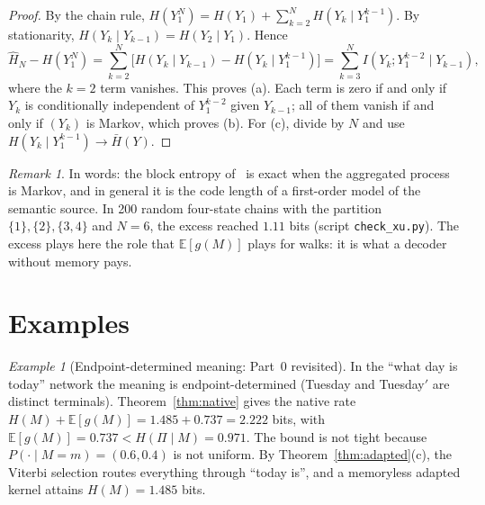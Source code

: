 \documentclass[11pt]{article}
\theoremstyle{definition}
\theoremstyle{remark}
\newtheorem{remark}{Remark}
\newtheorem{example}{Example}
\newcommand{\E}{\mathbb{E}}
\begin{document}
\begin{proof}
By the chain rule, $H(Y_1^N)=H(Y_1)+\sum_{k=2}^NH(Y_k\mid Y_1^{k-1})$. By stationarity, $H(Y_k\mid Y_{k-1})=H(Y_2\mid Y_1)$. Hence
\[
\widehat H_N-H(Y_1^N)=\sum_{k=2}^N\bigl[H(Y_k\mid Y_{k-1})-H(Y_k\mid Y_1^{k-1})\bigr]=\sum_{k=3}^NI(Y_k;Y_1^{k-2}\mid Y_{k-1}),
\]
where the $k=2$ term vanishes. This proves (a). Each term is zero if and only if $Y_k$ is conditionally independent of $Y_1^{k-2}$ given $Y_{k-1}$; all of them vanish if and only if $(Y_k)$ is Markov, which proves (b). For (c), divide by $N$ and use $H(Y_k\mid Y_1^{k-1})\to\bar H(Y)$.
\end{proof}

\begin{remark}
In words: the block entropy of~\cite[Thm.~3]{xu2025} is exact when the aggregated process is Markov, and in general it is the code length of a first-order model of the semantic source. In 200 random four-state chains with the partition $\{1\},\{2\},\{3,4\}$ and $N=6$, the excess reached $1.11$ bits (script \texttt{check\_xu.py}). The excess plays here the role that $\E[g(M)]$ plays for walks: it is what a decoder without memory pays.
\end{remark}

\section{Examples}

\begin{example}[Endpoint-determined meaning: Part~0 revisited]
In the ``what day is today'' network the meaning is endpoint-determined (Tuesday and Tuesday$'$ are distinct terminals). Theorem~\ref{thm:native} gives the native rate $H(M)+\E[g(M)]=1.485+0.737=2.222$ bits, with $\E[g(M)]=0.737<H(\Pi\mid M)=0.971$. The bound is not tight because $P(\cdot\mid M=m)=(0.6,0.4)$ is not uniform. By Theorem~\ref{thm:adapted}(c), the Viterbi selection routes everything through ``today is'', and a memoryless adapted kernel attains $H(M)=1.485$ bits.
\end{example}
\end{document}

